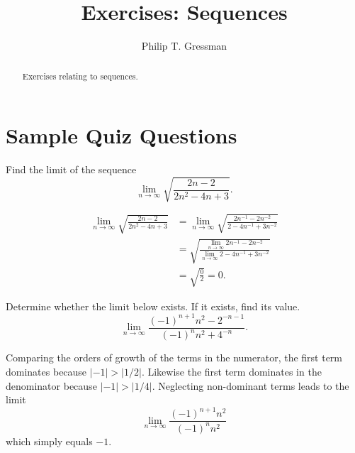 \documentclass{ximera}
\title{Exercises: Sequences}
\author{Philip T. Gressman}
\begin{document}
\begin{abstract}
Exercises relating to sequences.
\end{abstract}
\maketitle


\section*{Sample Quiz Questions}

\begin{question}%

Find the limit of the sequence
\[\lim_{n \rightarrow \infty} \sqrt{\frac{2n-2}{2n^2-4n+3}}.\] 
\begin{multiplechoice}
\end{multiplechoice}
\begin{feedback}
\[\begin{aligned}
\lim_{n \rightarrow \infty} \sqrt{\frac{2n-2}{2n^2-4n+3}} & = \lim_{n \rightarrow \infty} \sqrt{\frac{2n^{-1}-2n^{-2}}{2-4n^{-1}+3n^{-2}}} \\
 & = \sqrt{\frac{\lim_{n \rightarrow \infty} 2n^{-1}-2n^{-2}}{\lim_{n \rightarrow \infty} 2-4n^{-1}+3n^{-2}}} \\
 & = \sqrt{\frac{0}{2}} = 0. 
\end{aligned}\]
\end{feedback}

\end{question}

\begin{question}%

Determine whether the limit below exists. If it exists, find its value.
\[\lim_{n \rightarrow \infty} \frac{(-1)^{n+1}n^2 - 2^{-n-1}}{(-1)^{n}n^2 + 4^{-n}}.\] 
\begin{multiplechoice}
\end{multiplechoice}
\begin{feedback}
Comparing the orders of growth of the terms in the numerator, the first term dominates because \(|-1|>|1/2|\). Likewise the first term dominates in the denominator because  \(|-1|>|1/4|\). Neglecting non-dominant terms leads to the limit \[\lim_{n \rightarrow \infty} \frac{(-1)^{n+1}n^2}{(-1)^{n}n^2}\] which simply equals \(-1\).
\end{feedback}

\end{question}
\end{document}
